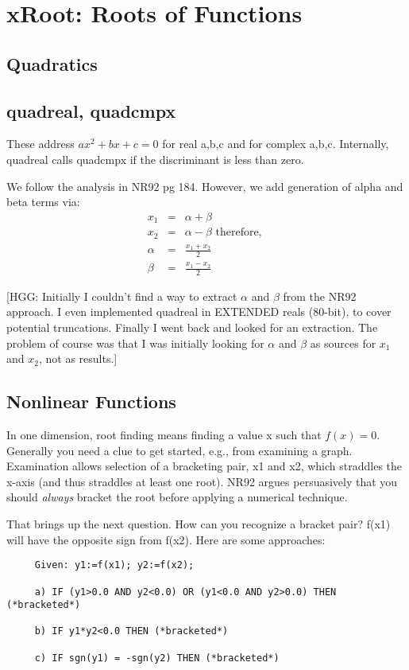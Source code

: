 \section{xRoot: Roots of Functions}
\subsection{Quadratics}
\subsection*{quadreal, quadcmpx}
These address $ax^2+bx+c=0$ for real a,b,c and for complex a,b,c.
Internally, quadreal calls quadcmpx if the discriminant is less than zero.

We follow the analysis in NR92 pg 184.  However, we add generation of
alpha and beta terms via:
\begin{eqnarray}
  x_1    & = & \alpha + \beta\\
  x_2    & = & \alpha - \beta \mbox{ therefore, }\\  
  \alpha & = & \frac{x_1+x_2}{2}\\
  \beta  & = & \frac{x_1-x_2}{2}
\end{eqnarray}

[HGG: Initially I couldn't find a way to extract $\alpha$ and
$\beta$ from the NR92 approach.  I even implemented quadreal in
EXTENDED reals (80-bit), to cover potential truncations.  Finally I went
back and looked for an extraction.  The problem of course was that
I was initially looking for $\alpha$ and $\beta$ as sources for
$x_1$ and $x_2$, not as results.]

\subsection{Nonlinear Functions}
In one dimension, root finding means finding a value x such
that $f(x) = 0$.  Generally you need a clue to get started,
e.g., from examining a graph.  Examination allows selection
of a bracketing pair, x1 and x2, which straddles the x-axis
(and thus straddles at least one root).  NR92 argues
persuasively that you should {\em always} bracket the root
before applying a numerical technique.

That brings up the next question.  How can you recognize a
bracket pair?  f(x1) will have the opposite sign from f(x2).
Here are some approaches:
\begin{verbatim}
     Given: y1:=f(x1); y2:=f(x2);
     
     a) IF (y1>0.0 AND y2<0.0) OR (y1<0.0 AND y2>0.0) THEN (*bracketed*)
     
     b) IF y1*y2<0.0 THEN (*bracketed*)
     
     c) IF sgn(y1) = -sgn(y2) THEN (*bracketed*)
\end{verbatim}

